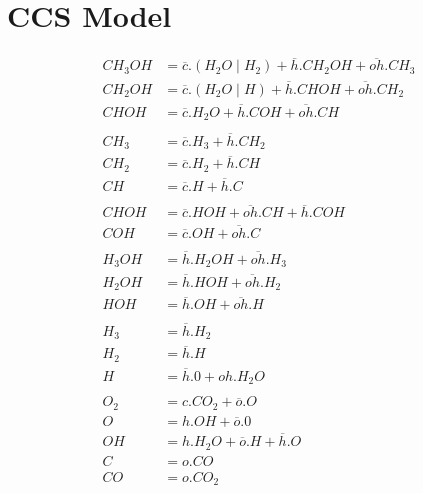 \documentclass[12pt, a4paper]{article}
\begin{document}
\section{CCS Model}
\begin{align*}
CH_3OH &= \overline{c}.(H_2O \mid H_2) + \overline{h}.CH_2OH + \overline{oh}.CH_3 \\
CH_2OH &= \overline{c}.(H_2O \mid H) + \overline{h}.CHOH + \overline{oh}.CH_2 \\
CHOH &= \overline{c}.H_2O + \overline{h}.COH + \overline{oh}.CH \\
\\
CH_3 &= \overline{c}.H_3 + \overline{h}.CH_2 \\
CH_2 &= \overline{c}.H_2 + \overline{h}.CH \\
CH &= \overline{c}.H + \overline{h}.C \\
\\
CHOH &= \overline{c}.HOH + \overline{oh}.CH + \overline{h}.COH \\
COH &= \overline{c}.OH + \overline{oh}.C \\
\\
H_3OH &= \overline{h}.H_2OH + \overline{oh}.H_3 \\
H_2OH &= \overline{h}.HOH + \overline{oh}.H_2 \\
HOH &= \overline{h}.OH + \overline{oh}.H \\
\\
H_3 &= \overline{h}.H_2 \\
H_2 &= \overline{h}.H \\
H &= \overline{h}.0 + oh.H_2O \\
\\
O_2 &= c.CO_2 + \overline{o}.O \\
O &= h.OH + \overline{o}.0 \\
OH &= h.H_2O + \overline{o}.H + \overline{h}.O \\
C &= o.CO \\
CO &= o.CO_2
\end{align*}
\end{document}
